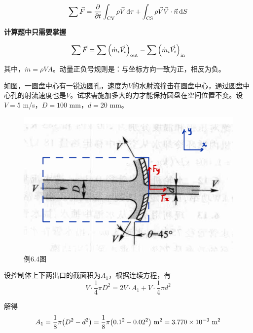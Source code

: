 
\begin{equation}
	\sum \vec{F} = \pdv{t} \int_{\text{CV}} \rho \vec{V} \dd{\tau} + \int_{\text{CS}} \rho \vec{V} \vec{V} \cdot \vec{n} \dd{S} 
\end{equation}

\textbf{计算题中只需要掌握}

\begin{equation}
	\sum \vec{F} = \sum \qty(\dot{m}_i \vec{V}_i)_{\text{out}} - \sum \qty(\dot{m}_i \vec{V}_i)_{\text{in}}
\end{equation}

其中，$\dot{m} = \rho V A$。动量正负号规则是：与坐标方向一致为正，相反为负。


\begin{example}
	如图，一圆盘中心有一锐边圆孔，速度为$V$的水射流撞击在圆盘中心，通过圆盘中心孔的射流速度也是$V$。试求需施加多大的力才能保持圆盘在空间位置不变。设$V = 5$ m/s，$D = 100$ mm，$d = 20$ mm。
	
	\begin{figure}[H]
		\centering
		\includegraphics[scale=0.12]{figures/C6-fig3.png}
		\caption{例6.4图}
	\end{figure}
	
	设控制体上下两出口的截面积为$A_1$，根据连续方程，有
	\begin{equation*}
		V \cdot \dfrac{1}{4} \pi D^2 = 2 V \cdot A_1 + V \cdot \dfrac{1}{4} \pi d^2
	\end{equation*}
	
	解得
	\begin{equation*}
		A_1 = \dfrac{1}{8} \pi \qty(D^2 - d^2) = \dfrac{1}{8} \pi \qty(0.1^2 - 0.02^2) \mathrm{~m}^2 = 3.770 \times 10^{-3} \mathrm{~m}^2
	\end{equation*}
	

\end{example}
